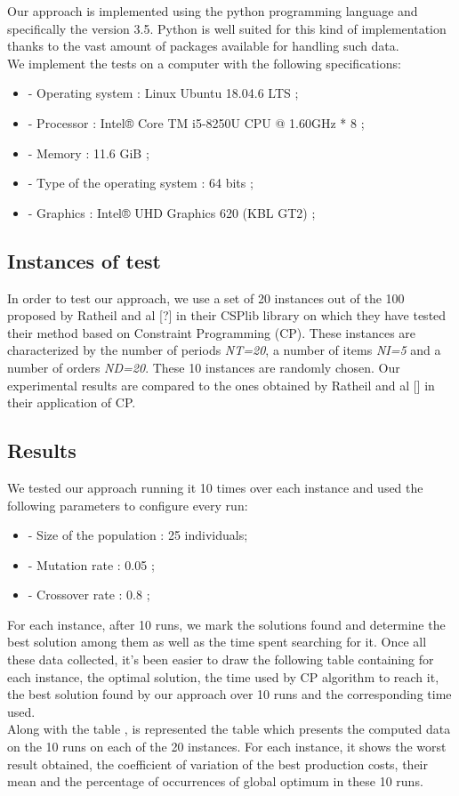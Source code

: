 \documentclass[twocolumn,10pt]{asme2ej}
\begin{document}
Our approach is implemented using the python programming language and specifically the version 3.5. Python is well suited for this kind of implementation thanks to the vast amount of packages available for handling such data.\\
We implement the tests on a computer with the following specifications:
\begin{itemize}
    \item - Operating system : Linux Ubuntu 18.04.6 LTS ;
    \item - Processor : Intel® Core TM i5-8250U CPU  @ 1.60GHz * 8 ;
    \item - Memory : 11.6 GiB ;
    \item - Type of the operating system : 64 bits ;
    \item - Graphics : Intel® UHD Graphics 620 (KBL GT2) ;
\end{itemize}

\subsection{Instances of test}
In order to test our approach, we use a set of 20 instances out of the 100 proposed by Ratheil and al [?] in their CSPlib library on which they have tested their method based on Constraint Programming (CP). These instances are characterized by the number of periods \emph{NT=20}, a number of items \emph{NI=5} and a number of orders \emph{ND=20}. These 10 instances are randomly chosen. Our experimental results are compared to the ones obtained by Ratheil and al [] in their application of CP.

\subsection{Results}

We tested our approach running it 10 times over each instance and used the following parameters to configure every run:

\begin{itemize}
    \item - Size of the population : 25 individuals;
    \item - Mutation rate : 0.05 ;
    \item - Crossover rate : 0.8 ;
\end{itemize}

For each instance, after 10 runs, we mark the solutions found and determine the best solution among them as well as the time spent searching for it. Once all these data collected, it's been easier to draw the following table \cite{tab:cpGaResults} containing for each instance, the optimal solution, the time used by CP algorithm to reach it, the best solution found by our approach over 10 runs and the corresponding time used. \\
Along with the table \cite{tab:cpGaResults}, is represented the table \cite{tab:gaStatsResults} which presents the computed data on the 10 runs on each of the 20 instances. For each instance, it shows the worst result obtained, the coefficient of variation of the best production costs, their mean and the percentage of occurrences of global optimum in these 10 runs.  
\end{document}
